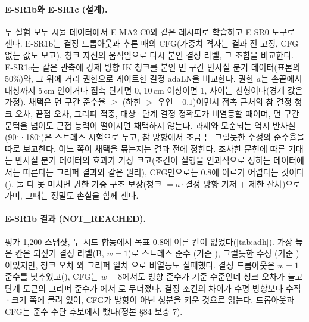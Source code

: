 \paragraph{E-SR1b와 E-SR1c (설계).} 두 실험 모두 시뮬 데이터에서 E-MA2 C0와 같은 레시피로 학습하고 E-SR0 도구로 잰다. E-SR1b는 결정 드롭아웃과 추론 때의 CFG(가중치 격자는 결과 전 고정, CFG 없는 값도 보고), 청크 자신의 움직임으로 다시 붙인 결정 라벨, 그 조합을 비교한다. E-SR1c는 같은 관측에 강제 방향 IK 청크를 붙인 먼 구간 반사실 분기 데이터(표본의 50\%)와, 그 위에 거리 권한으로 게이트한 결정 adaLN을 비교한다. 권한 $a$는 손끝에서 대상까지 5\,cm 안이거나 접촉 단계면 0, 10\,cm 이상이면 1, 사이는 선형이다(경계 값은 가정). 채택은 먼 구간 준수율 $\ge$ (하한 $>$ 우연 $+0.1$)이면서 접촉 근처의 참 결정 청크 오차, 끝점 오차, 그리퍼 적중, 대상·단계 결정 정확도가 비열등할 때이며, 먼 구간 문턱을 넘어도 근접 능력이 떨어지면 채택하지 않는다. 과제와 모순되는 억지 반사실(90$^\circ$·180$^\circ$)은 스트레스 시험으로 두고, 참 방향에서 조금 튼 그럴듯한 수정의 준수율을 따로 보고한다. 어느 쪽이 채택을 묶는지는 결과 전에 정한다. 조사한 문헌에 따른 기대는 반사실 분기 데이터의 효과가 가장 크고(조건이 실행을 인과적으로 정하는 데이터에서는 따른다는 그리퍼 결과와 같은 원리), CFG만으로는 0.8에 이르기 어렵다는 것이다(). 둘 다 못 미치면 권한 가중 구조 보장(청크 $=a\cdot$결정 방향 기저 $+$ 제한 잔차)으로 가며, 그때는 정밀도 손실을 함께 잰다.

\paragraph{E-SR1b 결과 (NOT\_REACHED).} 평가 1,200 스냅샷, 두 시드 합동에서 목표 0.8에 이른 칸이 없었다(\cref{tab:adh}). 가장 높은 칸은 되짚기 결정 라벨(B, $w{=}1$)로 스트레스 준수 (기준 ), 그럴듯한 수정 (기준 )이었지만, 청크 오차 와 그리퍼 일치 으로 비열등도 실패했다. 결정 드롭아웃은 $w{=}1$ 준수를 낮추었고(), CFG는 $w{=}8$에서도 방향 준수가 기준 수준인데 청크 오차가  늘고 단계 토큰의 그리퍼 준수가 에서 로 무너졌다. 결정 조건의 차이가 수평 방향보다 수직·크기 쪽에 몰려 있어, CFG가 방향이 아닌 성분을 키운 것으로 읽는다. 드롭아웃과 CFG는 준수 수단 후보에서 뺐다(정본 §84 보충 7).


